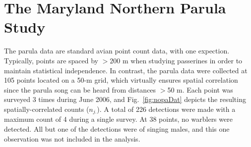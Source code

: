 \section{The Maryland Northern Parula Study}

The parula data are standard avian point count data, with one
expection. Typically, points are spaced by $>200$ m when studying
passerines in order to maintain statistical independence. In contrast,
the parula data were collected at
105 points located on a 50-m grid, which virtually ensures spatial
correlation since the parula song can be heard from distances $>$50 m.
Each point was surveyed 3 times during June 2006, and
Fig.~\ref{fig:nopaDat} depicts the resulting spatially-correlated
counts ($n_{j.}$). A total of 226 detections were made with a maximum
count of 4 during a single survey. At 38 points, no warblers were
detected. All but one of the detections were of singing males, and
this one observation was not included in the analysis.

